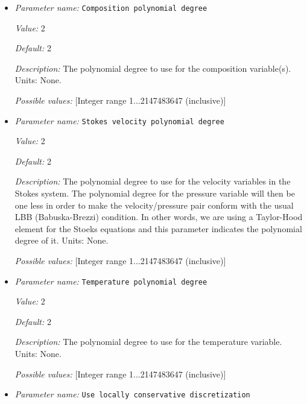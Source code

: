 \begin{itemize}
\item {\it Parameter name:} {\tt Composition polynomial degree}
\label{parameters:Discretization/Composition polynomial degree}


{\it Value:} 2


{\it Default:} 2


{\it Description:} The polynomial degree to use for the composition variable(s). Units: None.


{\it Possible values:} [Integer range 1...2147483647 (inclusive)]
\item {\it Parameter name:} {\tt Stokes velocity polynomial degree}
\label{parameters:Discretization/Stokes velocity polynomial degree}


{\it Value:} 2


{\it Default:} 2


{\it Description:} The polynomial degree to use for the velocity variables in the Stokes system. The polynomial degree for the pressure variable will then be one less in order to make the velocity/pressure pair conform with the usual LBB (Babuska-Brezzi) condition. In other words, we are using a Taylor-Hood element for the Stoeks equations and this parameter indicates the polynomial degree of it. Units: None.


{\it Possible values:} [Integer range 1...2147483647 (inclusive)]
\item {\it Parameter name:} {\tt Temperature polynomial degree}
\label{parameters:Discretization/Temperature polynomial degree}


{\it Value:} 2


{\it Default:} 2


{\it Description:} The polynomial degree to use for the temperature variable. Units: None.


{\it Possible values:} [Integer range 1...2147483647 (inclusive)]
\item {\it Parameter name:} {\tt Use locally conservative discretization}
\label{parameters:Discretization/Use locally conservative discretization}



\end{itemize}
